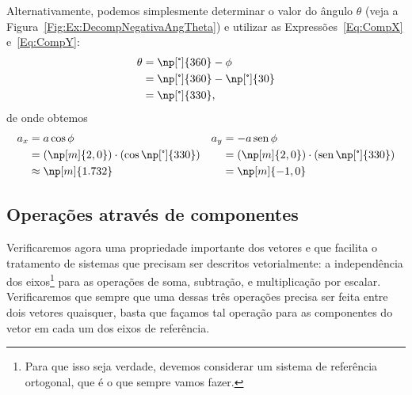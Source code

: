 Alternativamente, podemos simplesmente determinar o valor do ângulo $\theta$ (veja a Figura~\ref{Fig:Ex:DecompNegativaAngTheta}) e utilizar as Expressões~\eqref{Eq:CompX} e~\eqref{Eq:CompY}:
\begin{align}
    \theta &= \np[\tcdegree]{360} - \phi \\
    &= \np[\tcdegree]{360} - \np[\tcdegree]{30} \\
    &= \np[\tcdegree]{330},
\end{align}
%
de onde obtemos
\begin{align}
    a_x &= a\cos\phi & a_y &= -a\sen\phi \\
    &= (\np[m]{2,0})\cdot(\cos\np[\tcdegree]{330}) & &= (\np[m]{2,0})\cdot(\sen\np[\tcdegree]{330}) \\
    &\approx \np[m]{1.732} & &= \np[m]{-1,0}
\end{align}

\subsection{Operações através de componentes}
\label{Sec:OpAtravesDeComp}

Verificaremos agora uma propriedade importante dos vetores e que facilita o tratamento de sistemas que precisam ser descritos vetorialmente: a independência dos eixos\footnote[][-1cm]{Para que isso seja verdade, devemos considerar um sistema de referência ortogonal, que é o que sempre vamos fazer.} para as operações de soma, subtração, e multiplicação por escalar. Verificaremos que sempre que uma dessas três operações precisa ser feita entre dois vetores quaisquer, basta que façamos tal operação para as componentes do vetor em cada um dos eixos de referência.

